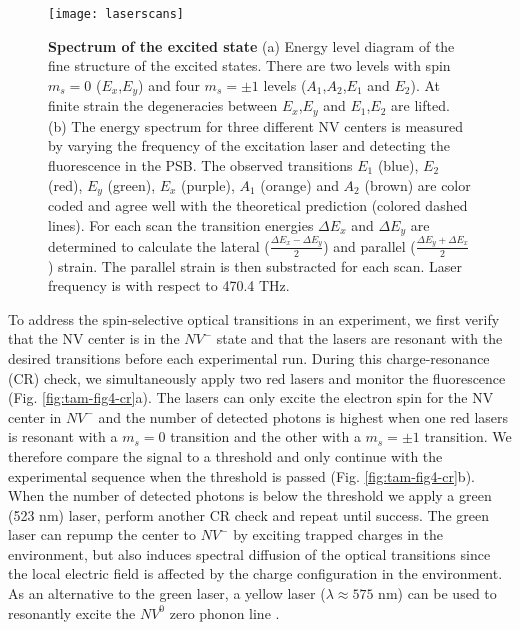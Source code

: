 \begin{figure*}
	\centering
	\texttt{[image: laserscans]}
	\caption{\label{fig:tam-fig4-laserscan} \textbf{Spectrum of the excited state} (a) Energy level diagram of the fine structure of the excited states. There are two levels with spin $m_s = 0$ ($E_x$,$E_y$) and four $m_s = \pm 1$ levels ($A_1$,$A_2$,$E_1$ and $E_2$). At finite strain the degeneracies between $E_x$,$E_y$ and $E_1$,$E_2$ are lifted. (b) The energy spectrum for three different NV centers is measured by varying the frequency of the excitation laser and detecting the fluorescence in the PSB. The observed transitions $E_1$ (blue), $E_2$ (red), $E_y$ (green), $E_x$ (purple), $A_1$ (orange) and $A_2$ (brown) are color coded and agree well with the theoretical prediction (colored dashed lines). For each scan the transition energies $\Delta E_x$ and $\Delta E_y$ are determined to calculate the lateral ($\frac{\Delta E_x-\Delta E_y}{2}$) and parallel ($\frac{\Delta E_y+\Delta E_x}{2}$) strain. The parallel strain is then substracted for each scan. Laser frequency is with respect to 470.4 THz.}
\end{figure*}

To address the spin-selective optical transitions in an experiment, we first verify that the NV center is in the $NV^-$ state and that the lasers are resonant with the desired transitions before each experimental run. During this charge-resonance (CR) check, we simultaneously apply two red lasers and monitor the fluorescence (Fig. \ref{fig:tam-fig4-cr}a). The lasers can only excite the electron spin for the NV center in $NV^-$ and the number of detected photons is highest when one red lasers is resonant with a $m_s = 0$ transition and the other with a $m_s=\pm1$ transition. We therefore compare the signal to a threshold and only continue with the experimental sequence when the threshold is passed (Fig. \ref{fig:tam-fig4-cr}b). When the number of detected photons is below the threshold we apply a green (523 nm) laser, perform another CR check and repeat until success. The green laser can repump the center to $NV^-$ by exciting trapped charges in the environment, but also induces spectral diffusion of the optical transitions since the local electric field is affected by the charge configuration in the environment. As an alternative to the green laser, a yellow laser ($\lambda \approx 575$ nm) can be used to resonantly excite the $NV^0$ zero phonon line \cite{Siyushev_Phys.Rev.Lett._2013}. 

